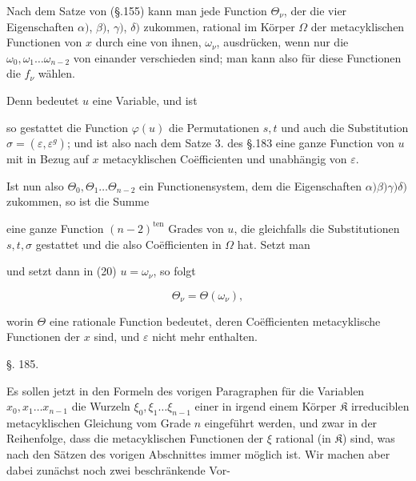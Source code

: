 Nach dem Satze von  (§.155) kann man jede Function
$\Theta_\nu$, der die vier Eigenschaften $\alpha)$, $\beta)$, $\gamma)$,
$\delta)$ zukommen, rational im Körper $\Omega$ der metacyklischen
Functionen von $x$ durch eine von ihnen, $\omega_\nu$, ausdrücken, wenn
nur die $\omega_0, \omega_1 \ldots \omega_{n-2}$ von einander verschieden
sind; man kann also für diese Functionen die $f_\nu$ wählen.

Denn bedeutet $u$ eine Variable, und ist


so gestattet die Function $\varphi(u)$ die Permutationen $s, t$ und auch
die Substitution $\sigma = (\varepsilon, \varepsilon^g)$; und ist also
nach dem Satze 3. des §.183 eine ganze Function von $u$ mit in Bezug auf
$x$ metacyklischen Co\"efficienten und unabhängig von $\varepsilon$.

Ist nun also $\Theta_0, \Theta_1 \ldots \Theta_{n-2}$ ein
Functionensystem, dem die Eigenschaften $\alpha) \beta) \gamma) \delta)$
zukommen, so ist die Summe


eine ganze Function $(n-2)^{\text{ten}}$ Grades von $u$, die gleichfalls
die Substitutionen $s, t, \sigma$ gestattet und die also Coëfficienten in
$\Omega$ hat. Setzt man


und setzt dann in (20) $u = \omega_\nu$, so folgt

\[
\Theta_\nu = \Theta(\omega_\nu),
\]

worin $\Theta$ eine rationale Function bedeutet, deren Coëfficienten
metacyklische Functionen der $x$ sind, und $\varepsilon$ nicht mehr
enthalten.

\begin{center}
§. 185.

\end{center}

Es sollen jetzt in den Formeln des vorigen Paragraphen für die Variablen
$x_0, x_1 \ldots x_{n-1}$ die Wurzeln $\xi_0, \xi_1 \ldots \xi_{n-1}$
einer in irgend einem Körper $\mathfrak{K}$
irreduciblen metacyklischen Gleichung vom Grade $n$ eingeführt werden,
und zwar in der Reihenfolge, dass die metacyklischen Functionen der
$\xi$ rational (in $\mathfrak{K}$) sind, was nach den Sätzen des vorigen
Abschnittes immer möglich ist. Wir machen aber dabei zunächst noch zwei
beschränkende Vor-
